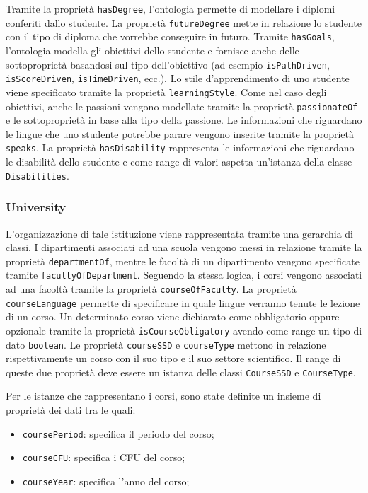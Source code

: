 Tramite la proprietà \texttt{hasDegree}, l'ontologia permette di modellare i diplomi conferiti dallo studente. La proprietà \texttt{futureDegree} mette in relazione lo studente con il tipo di diploma che vorrebbe conseguire in futuro. Tramite \texttt{hasGoals}, l'ontologia modella gli obiettivi dello studente e fornisce anche delle sottoproprietà basandosi sul tipo dell'obiettivo (ad esempio \texttt{isPathDriven}, \texttt{isScoreDriven}, \texttt{isTimeDriven}, ecc.). Lo stile d'apprendimento di uno studente viene specificato tramite la proprietà \texttt{learningStyle}. Come nel caso degli obiettivi, anche le passioni vengono modellate tramite la proprietà \texttt{passionateOf} e le sottoproprietà in base alla tipo della passione. Le informazioni che riguardano le lingue che uno studente potrebbe parare vengono inserite tramite la proprietà \texttt{speaks}.
La proprietà \texttt{hasDisability} rappresenta le informazioni che riguardano le disabilità dello studente e come range di valori aspetta un'istanza della classe \texttt{Disabilities}.

\subsubsection{University}
L'organizzazione di tale istituzione viene rappresentata tramite una gerarchia di classi. I dipartimenti associati ad una scuola vengono messi in relazione tramite la proprietà \texttt{departmentOf}, mentre le facoltà di un dipartimento vengono specificate tramite \texttt{facultyOfDepartment}. Seguendo la stessa logica, i corsi vengono associati ad una facoltà tramite la proprietà \texttt{courseOfFaculty}. La proprietà \texttt{courseLanguage} permette di specificare in quale lingue verranno tenute le lezione di un corso. Un determinato corso viene dichiarato come obbligatorio oppure opzionale tramite la proprietà \texttt{isCourseObligatory} avendo come range un tipo di dato \texttt{boolean}. Le proprietà \texttt{courseSSD} e \texttt{courseType} mettono in relazione rispettivamente un corso con il suo tipo e il suo settore scientifico. Il range di queste due proprietà deve essere un istanza delle classi \texttt{CourseSSD} e \texttt{CourseType}. 

Per le istanze che rappresentano i corsi, sono state definite un insieme di proprietà dei dati tra le quali:
\begin{itemize}
    \item \texttt{coursePeriod}: specifica il periodo del corso;
    \item \texttt{courseCFU}: specifica i CFU del corso;
    \item \texttt{courseYear}: specifica l'anno del corso;
\end{itemize}

